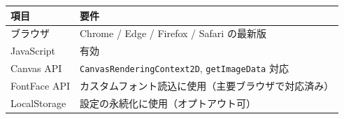 \begin{tabularx}{\textwidth}{l X}
\toprule
\textbf{項目} & \textbf{要件} \\
\midrule
ブラウザ & Chrome / Edge / Firefox / Safari の最新版 \\
JavaScript & 有効 \\
Canvas API & \texttt{CanvasRenderingContext2D}, \texttt{getImageData} 対応 \\
FontFace API & カスタムフォント読込に使用（主要ブラウザで対応済み）\\
LocalStorage & 設定の永続化に使用（オプトアウト可）\\
\bottomrule
\end{tabularx}

\newpage
